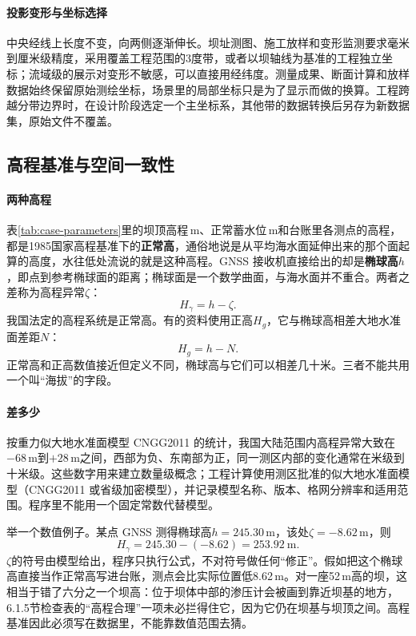 \paragraph{投影变形与坐标选择}中央经线上长度不变，向两侧逐渐伸长。坝址测图、施工放样和变形监测要求毫米到厘米级精度，采用覆盖工程范围的3度带，或者以坝轴线为基准的工程独立坐标；流域级的展示对变形不敏感，可以直接用经纬度。测量成果、断面计算和放样数据始终保留原始测绘坐标，场景里的局部坐标只是为了显示而做的换算。工程跨越分带边界时，在设计阶段选定一个主坐标系，其他带的数据转换后另存为新数据集，原始文件不覆盖。

\subsection{高程基准与空间一致性}

\paragraph{两种高程}表\ref{tab:case-parameters}里的坝顶高程\cpCrestElev\,m、正常蓄水位\cpNormalLevel\,m和台账里各测点的高程，都是1985国家高程基准下的\textbf{正常高}，通俗地说是从平均海水面延伸出来的那个面起算的高度，水往低处流说的就是这种高程。GNSS 接收机直接给出的却是\textbf{椭球高}$h$，即点到参考椭球面的距离；椭球面是一个数学曲面，与海水面并不重合。两者之差称为高程异常$\zeta$：
\[
  H_\gamma=h-\zeta .
\]
我国法定的高程系统是正常高。有的资料使用正高$H_g$，它与椭球高相差大地水准面差距$N$：
\[
  H_g=h-N .
\]
正常高和正高数值接近但定义不同，椭球高与它们可以相差几十米。三者不能共用一个叫“海拔”的字段。

\paragraph{差多少}按重力似大地水准面模型 CNGG2011 的统计，我国大陆范围内高程异常大致在$-68$\,m到$+28$\,m之间\cite{li2012cngg}，西部为负、东南部为正，同一测区内部的变化通常在米级到十米级。这些数字用来建立数量级概念；工程计算使用测区批准的似大地水准面模型（CNGG2011 或省级加密模型），并记录模型名称、版本、格网分辨率和适用范围。程序里不能用一个固定常数代替模型。

举一个数值例子。某点 GNSS 测得椭球高$h=245.30$\,m，该处$\zeta=-8.62$\,m，则
\[
  H_\gamma=245.30-(-8.62)=253.92\ \mathrm{m}.
\]
$\zeta$的符号由模型给出，程序只执行公式，不对符号做任何“修正”。假如把这个椭球高直接当作正常高写进台账，测点会比实际位置低8.62\,m。对一座52\,m高的坝，这相当于错了六分之一个坝高：位于坝体中部的渗压计会被画到靠近坝基的地方，6.1.5节检查表的“高程合理”一项未必拦得住它，因为它仍在坝基与坝顶之间。高程基准因此必须写在数据里，不能靠数值范围去猜。

